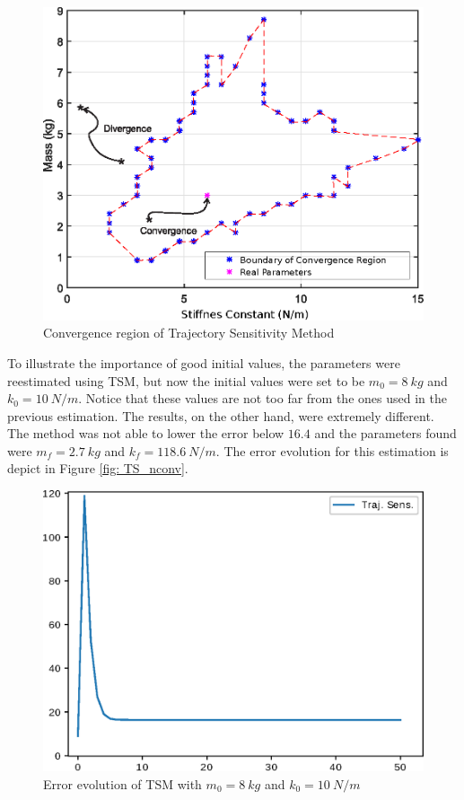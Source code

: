 \begin{figure}[h]
	\caption{Convergence region of Trajectory Sensitivity Method}
	\begin{center}
		\includegraphics[scale=0.8]{Images/Conv_reg.eps}
	\end{center}
	\label{fig: conv_reg}
\end{figure}

To illustrate the importance of good initial values, the parameters were reestimated using TSM, but now the initial values were set to be $m_{0} = 8\ kg$ and $k_{0} = 10\ N/m$. Notice that these values are not too far from the ones used in the previous estimation. The results, on the other hand, were extremely different. The method was not able to lower the error below $16.4$ and the parameters found were $m_{f} = 2.7\ kg$ and $k_{f} = 118.6\ N/m$. The error evolution for this estimation is depict in Figure \ref{fig: TS_nconv}.

\begin{figure}[h]
	\caption{Error evolution of TSM with $m_{0} = 8\ kg$ and $k_{0} = 10\ N/m$}
	\begin{center}
		\includegraphics[scale=0.75]{Images/TS_nconv.eps}
	\end{center}
\end{figure}


